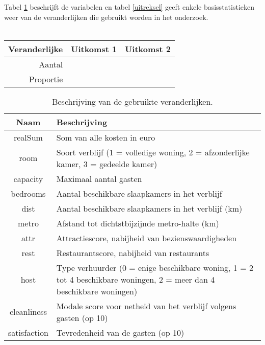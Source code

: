 \documentclass[a4paper]{kulakarticle}
\begin{document}
	Tabel \ref{beschrijving} beschrijft de variabelen en tabel \ref{uitreksel} geeft enkele basisstatistieken weer van de veranderlijken die gebruikt worden in het onderzoek. \\\\
\begin{table}[h]
		\begin{tabular}{r*{2}{|r}}
			Veranderlijke & Uitkomst 1 & Uitkomst 2 \\ \hline
			Aantal &            &            \\ \hline
			Proportie &            &
		\end{tabular}
\end{table}
\begin{table}[h]
	\begin{tabular}{c|p{10cm}}
		\raggedright
		Naam & Beschrijving\\
		\hline
		realSum & Som van alle kosten in euro\\ 
		room & Soort verblijf (1 = volledige woning, 2 = afzonderlijke kamer, 
		3 = gedeelde kamer) \\ 
		capacity & Maximaal aantal gasten \\
		bedrooms & Aantal beschikbare slaapkamers in het verblijf \\
		dist & Aantal beschikbare slaapkamers in het verblijf (km) \\
		metro & Afstand tot dichtstbijzijnde metro-halte (km)\\
		attr & Attractiescore, nabijheid van bezienswaardigheden \\
		rest & Restaurantscore, nabijheid van restaurants \\ 
		host & Type verhuurder (0 = enige beschikbare woning, 1 = 2 tot 4 beschikbare woningen,
		2 = meer dan 4 beschikbare woningen) \\ 
		cleanliness & Modale score voor netheid van het verblijf volgens gasten (op 10) \\
		satisfaction & Tevredenheid van de gasten (op 10)\\
		
	\end{tabular}
	\caption{Beschrijving van de gebruikte veranderlijken.}
	\label{beschrijving}
\end{table}
\end{document}
